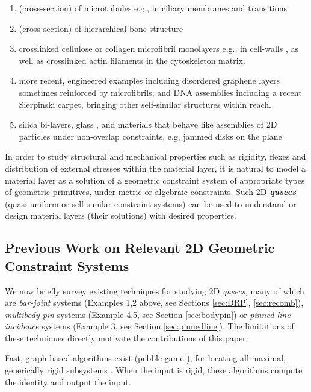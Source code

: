 \begin{enumerate}
    \item (cross-section) of microtubules \cite{Necklace1} e.g., in
ciliary membranes and transitions \cite{Necklace2}
    \item (cross-section) of hierarchical bone structure \cite{XX} %
    \item crosslinked cellulose or collagen microfibril monolayers e.g.,
in cell-walls \cite{CellWalls1} \cite{CellWalls1}, as well as crosslinked
actin filaments in the cytoskeleton matrix.
    \item more recent, engineered examples including  disordered graphene
layers \cite{Graphene1} \cite{Graphene2} sometimes reinforced
    by  microfibrils; and DNA assemblies \cite{Microfibrils1} including a
recent Sierpinski carpet, bringing other self-similar structures
    \cite{Microfibrils2} within reach.
    \item  silica bi-layers, glass \cite{SilicaGlass1}
\cite{SilicaGlass2}, and materials that behave like assemblies of
    2D particles under non-overlap constraints, e.g, jammed
    disks on the plane \cite{JammedDisk1}
%
\end{enumerate}
%
In order to study structural and mechanical properties
such as rigidity, flexes and distribution of external stresses
within the material layer, it is natural to model a material
layer as a solution of a geometric constraint system
of appropriate types of geometric primitives, under
metric or algebraic constraints.
Such  2D {\bf{\em qusecs}} (quasi-uniform or self-similar
constraint systems) can be used to
understand or design material layers (their solutions)
with desired properties.
%
\subsection{Previous Work on Relevant 2D Geometric Constraint Systems} We
now briefly survey existing techniques for studying 2D {\em qusecs,}  many
of which are {\it bar-joint} systems (Examples 1,2 above, see Sections
\ref{sec:DRP}, \ref{sec:recomb}),
{\it multibody-pin} systems (Example 4,5, see Section \ref{sec:bodypin}) or  {\it
pinned-line incidence} systems (Example 3, see Section \ref{sec:pinnedline}). The
limitations of these techniques directly motivate
the contributions of this paper.

\medskip\noindent{}
Fast, graph-based algorithms exist (pebble-game \cite{XX}),
for locating all maximal, generically rigid subsystems \cite{XX}.
When the input is rigid, these algorithms compute the identity and  output
the input.

